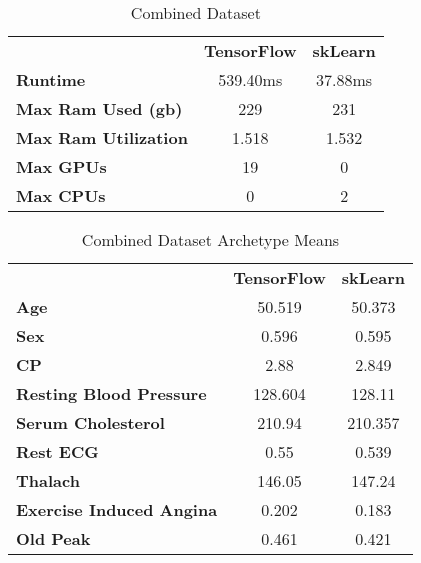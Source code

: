 \documentclass[conference]{IEEEtran}
\begin{document}
\FloatBarrier
\begin{table}[htbp]
\caption{Combined Dataset}
\begin{center}
\begin{tabular}{|l|c|c|}
\hline
\textbf{ }&\textbf{TensorFlow}&\textbf{skLearn} \\
\cline{1-3} 
\textbf{Runtime} & 539.40ms & 37.88ms \\
\cline{1-3} 
\textbf{Max Ram Used (gb)} & 229 & 231 \\
\cline{1-3} 
\textbf{Max Ram Utilization} & 1.518 & 1.532 \\
\cline{1-3} 
\textbf{Max GPUs} & 19 & 0 \\
\cline{1-3} 
\textbf{Max CPUs} & 0 & 2 \\
\hline
\end{tabular}
\label{tab9}
\end{center}
\end{table}
\FloatBarrier

\FloatBarrier
\begin{table}[!htbp]
\caption{Combined Dataset Archetype Means}
\begin{center}
\begin{tabular}{|l|c|c|}
\hline
\textbf{ }&\textbf{TensorFlow}&\textbf{skLearn} \\
\cline{1-3} 
\textbf{Age} & 50.519 & 50.373 \\
\cline{1-3} 
\textbf{Sex} & 0.596 & 0.595 \\
\cline{1-3} 
\textbf{CP} & 2.88 & 2.849 \\
\cline{1-3} 
\textbf{Resting Blood Pressure} & 128.604 & 128.11 \\
\cline{1-3} 
\textbf{Serum Cholesterol} & 210.94 & 210.357 \\
\cline{1-3} 
\textbf{Rest ECG} & 0.55 & 0.539 \\
\cline{1-3} 
\textbf{Thalach} & 146.05 & 147.24 \\
\cline{1-3} 
\textbf{Exercise Induced Angina} & 0.202 & 0.183 \\
\cline{1-3} 
\textbf{Old Peak} & 0.461 & 0.421 \\
\cline{1-3} 
\hline
\end{tabular}
\label{tab10}
\end{center}
\end{table}
\FloatBarrier

\end{document}
